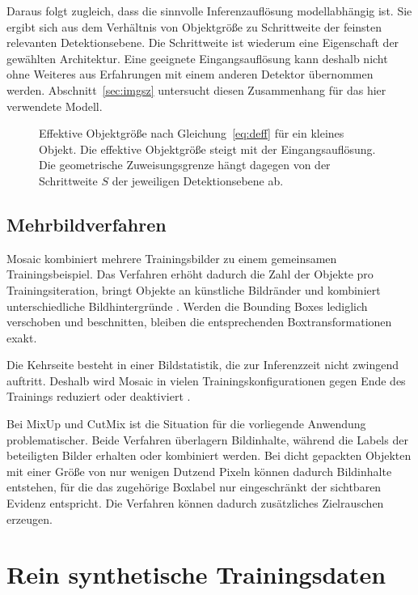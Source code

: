 Daraus folgt zugleich, dass die sinnvolle Inferenzauflösung modellabhängig ist. Sie ergibt sich aus dem Verhältnis von Objektgröße zu Schrittweite der feinsten relevanten Detektionsebene. Die Schrittweite ist wiederum eine Eigenschaft der gewählten Architektur. Eine geeignete Eingangsauflösung kann deshalb nicht ohne Weiteres aus Erfahrungen mit einem anderen Detektor übernommen werden. Abschnitt~\ref{sec:imgsz} untersucht diesen Zusammenhang für das hier verwendete Modell.

\begin{figure}[htbp]
\centering
\caption[Effektive Objektgröße und Zuweisungsgrenze]{Effektive Objektgröße nach Gleichung~\eqref{eq:deff} für ein kleines Objekt. Die effektive Objektgröße steigt mit der Eingangsauflösung. Die geometrische Zuweisungsgrenze hängt dagegen von der Schrittweite $S$ der jeweiligen Detektionsebene ab.}
\label{abb:aufloesung}
\end{figure}

\subsection{Mehrbildverfahren}

Mosaic kombiniert mehrere Trainingsbilder zu einem gemeinsamen Trainingsbeispiel. Das Verfahren erhöht dadurch die Zahl der Objekte pro Trainingsiteration, bringt Objekte an künstliche Bildränder und kombiniert unterschiedliche Bildhintergründe \parencite{bochkovskiy2020}. Werden die Bounding Boxes lediglich verschoben und beschnitten, bleiben die entsprechenden Boxtransformationen exakt.

Die Kehrseite besteht in einer Bildstatistik, die zur Inferenzzeit nicht zwingend auftritt. Deshalb wird Mosaic in vielen Trainingskonfigurationen gegen Ende des Trainings reduziert oder deaktiviert \parencite{ultralyticsdocs}.

Bei MixUp und CutMix ist die Situation für die vorliegende Anwendung problematischer. Beide Verfahren überlagern Bildinhalte, während die Labels der beteiligten Bilder erhalten oder kombiniert werden. Bei dicht gepackten Objekten mit einer Größe von nur wenigen Dutzend Pixeln können dadurch Bildinhalte entstehen, für die das zugehörige Boxlabel nur eingeschränkt der sichtbaren Evidenz entspricht. Die Verfahren können dadurch zusätzliches Zielrauschen erzeugen.

\section{Rein synthetische Trainingsdaten}
\label{sec:augsynthese}

